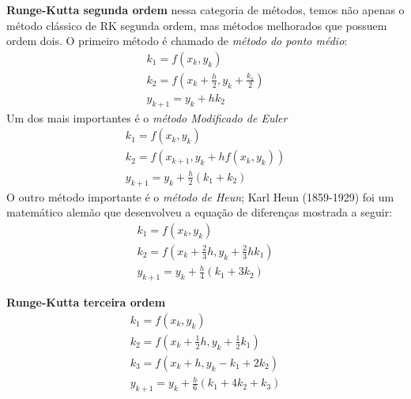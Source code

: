 \textbf{Runge-Kutta segunda ordem} nessa categoria de métodos, temos não apenas
o método clássico de RK segunda ordem, mas métodos melhorados que possuem ordem
dois. O primeiro método é chamado de \emph{método do ponto médio}:
\begin{equation*}
\begin{split}
k_{1} = f(x_{k},y_{k})\\
k_{2} = f(x_{k} + \frac{h}{2}, y_{k} + \frac{k_{1}}{2})\\
y_{k+1} = y_{k} + hk_{2}
\end{split}
\end{equation*}
Um dos mais importantes é o \emph{método Modificado de Euler}
\begin{equation*}
\begin{split}
k_{1} = f(x_{k}, y_{k})\\
k_{2} = f(x_{k+1}, y_{k} + hf(x_{k}, y_{k}))\\
y_{k+1} = y_{k} + \frac{h}{2}(k_{1} + k_{2})
\end{split}
\end{equation*}
O outro método importante é o \emph{método de Heun}; Karl Heun (1859-1929) foi um matemático alemão que desenvolveu a equação de diferenças mostrada a seguir:
\begin{equation*}
\begin{split}
k_{1} = f(x_{k}, y_{k})\\
k_{2} = f(x_{k} + \frac{2}{3}h, y_{k} + \frac{2}{3}hk_{1})\\
y_{k+1} = y_{k} + \frac{h}{4}(k_{1} + 3k_{2})
\end{split}
\end{equation*}

\textbf{Runge-Kutta terceira ordem}
\begin{equation*}
\begin{split}
k_{1} = f(x_{k}, y_{k})\\
k_{2} = f(x_{k} + \frac{1}{2}h, y_{k} + \frac{1}{2}k_{1})\\
k_{3} = f(x_{k} + h, y_{k} - k_{1} + 2k_{2})\\
y_{k+1} = y_{k} + \frac{h}{6}(k_{1} + 4k_{2} + k_{3})
\end{split}
\end{equation*}

